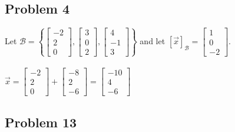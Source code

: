\documentclass{article}%
\begin{document}
\subsection*{Problem 4}

Let $\mathcal{B} =
\left\{
    \begin{bmatrix}
        -2 \\ 2 \\ 0
    \end{bmatrix},
    \begin{bmatrix}
        3 \\ 0 \\ 2
    \end{bmatrix},
    \begin{bmatrix}
        4 \\ -1 \\ 3
    \end{bmatrix}
\right\}$
and let $[\vec{x}]_\mathcal{B} =
\begin{bmatrix}
    1 \\ 0 \\ -2
\end{bmatrix}$.\\
\\[0.05in]
$\vec{x} =
\begin{bmatrix}
    -2 \\ 2 \\ 0
\end{bmatrix}
+
\begin{bmatrix}
    -8 \\ 2 \\ -6
\end{bmatrix}
=
\begin{bmatrix}
    -10 \\ 4 \\ -6
\end{bmatrix}$

\subsection*{Problem 13}
\end{document}
